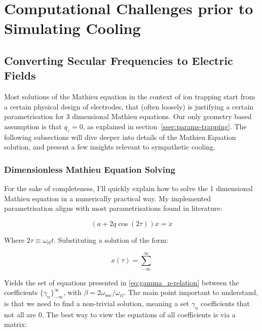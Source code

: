 \chapter{Computational Challenges prior to Simulating Cooling}

\section{Converting Secular Frequencies to Electric Fields}\label{sec:comp/freqs2aq}

Most solutions of the Mathieu equation in the context of ion trapping start from a certain physical design of electrodes, that (often loosely\cite{AkermanThesis}) is justifying a certain parametrisation for 3 dimensional Mathieu equations. Our only geometry based assumption is that $q_z = 0$, as explained in section~\ref{ssec:params-trapping}. The following subsections will dive deeper into details of the Mathieu Equation solution, and present a few insights relevant to sympathetic cooling. 

\subsection{Dimensionless Mathieu Equation Solving}\label{ssec:comp/mathieu}

For the sake of completeness, I'll quickly explain how to solve the 1 dimensional Mathieu equation in a numerically practical way. My implemented parametrisation aligns with most parametrisations found in literature:

\begin{equation}
	(a + 2 q \cos(2 \tau)) x = \ddot{x}
	\label{eq:bare-mathieu}
\end{equation}

Where $2\tau \equiv \omega_\mathrm{rf} t$. Substituting a solution of the form:

$$x(\tau) = \sum_{-\infty}^\infty $$

Yields the set of equations presented in \ref{eq:gamma_n-relation} between the coefficients $\{\gamma_n\}_{-\infty}^\infty$, with $\beta = 2 \omega_\mathrm{sec}/\omega_\mathrm{rf}$. The main point important to understand, is that we need to find a non-trivial solution, meaning a set $\gamma_n$ coefficients that not all are $0$. The best way to view the equations of all coefficients is via a matrix:

